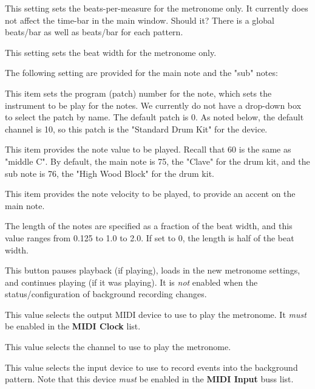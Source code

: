    This setting sets the beats-per-measure for the metronome only.
   It currently does not affect the time-bar in the main window.
   Should it? There is a global beats/bar as well as beats/bar for
   each pattern.

   This setting sets the beat width for the metronome only.

   The following setting are provided for the main note and the "sub" notes:

   This item sets the program (patch) number for the note, which sets the
   instrument to be play for the notes.
   We currently do not have a drop-down box to select the patch by name.
   The default patch is 0.
   As noted below, the default channel is 10, so this
   patch is the "Standard Drum Kit" for the device.

   This item provides the note value to be played.  Recall that 60 is the same
   as "middle C".  By default, the main note is 75, the "Clave" for the drum
   kit, and the sub note is 76, the "High Wood Block" for the drum kit.

   This item provides the note velocity to be played, to provide an accent on
   the main note.

   The length of the notes are specified as a fraction of the beat width, and
   this value ranges from 0.125 to 1.0 to 2.0.
   If set to 0, the length is half of the beat width.

   This button pauses playback (if playing),
   loads in the new metronome settings, and
   continues playing (if it was playing).
   It is \textsl{not} enabled when the status/configuration of background
   recording changes.

   This value selects the output MIDI device to use to play the metronome.
   It \textsl{must} be enabled in the \textbf{MIDI Clock} list.

   This value selects the channel to use to play the metronome.

   This value selects the input device to use to record events into the
   background pattern.
   Note that this device \textsl{must} be enabled in the \textbf{MIDI Input}
   buss list.

